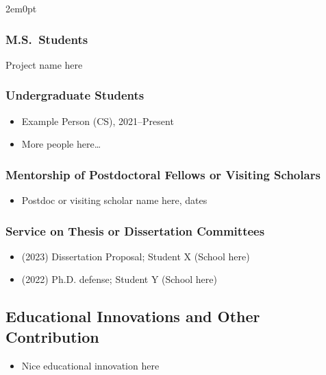 \documentclass[11pt]{article}
\begin{document}
\begin{adjustwidth}{2em}{0pt}
\subsubsection{M.S.\ Students}

\begin{itemize}
        {Project name here}
\end{itemize}

\subsubsection{Undergraduate Students}

\begin{itemize}
    \item Example Person (CS), 2021--Present
    \item More people here\dots
\end{itemize}

\subsubsection{Mentorship of Postdoctoral Fellows or Visiting Scholars}

\begin{itemize}
    \item Postdoc or visiting scholar name here, dates
\end{itemize}

\subsubsection{Service on Thesis or Dissertation Committees}

\begin{itemize}
    \item (2023) Dissertation Proposal; Student X (School here)
    \item (2022) Ph.D. defense; Student Y (School here)
\end{itemize}

\subsection{Educational Innovations and Other Contribution}


\begin{itemize}
    \item Nice educational innovation here
\end{itemize}


\end{adjustwidth}
\end{document}
